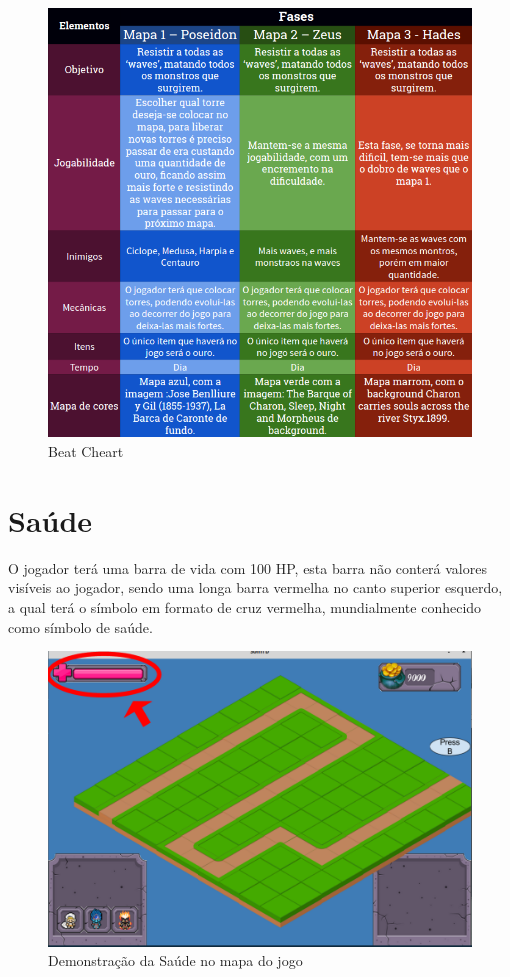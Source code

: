 \documentclass[11pt]{article} %
\begin{document}
\begin{figure}[!htp]
\centering
\advance\leftskip-3cm
\advance\rightskip-3cm
\includegraphics[scale=0.75]{res/beatCheart.png}
\caption{Beat Cheart}
\label{nivel3}
\end{figure}		
			

\section{Saúde}

O jogador terá uma barra de vida com 100 HP, esta barra não conterá valores visíveis ao jogador, sendo uma longa barra vermelha no canto superior esquerdo, a qual terá o símbolo em formato de cruz vermelha, mundialmente conhecido como símbolo de saúde.

\begin{figure}[!htp]
\centering
\includegraphics[scale=0.3]{res/saude.png}
\caption{Demonstração da Saúde no mapa do jogo}
\label{Saúde}
\end{figure}
 
\end{document}
